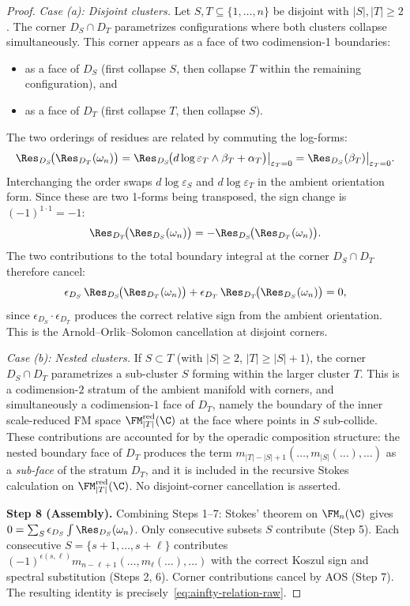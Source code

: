 \begin{proof}
\emph{Case (a): Disjoint clusters.} Let $S, T \subseteq \{1,\ldots,n\}$ be disjoint with $|S|, |T| \geq 2$. The corner $D_S \cap D_T$ parametrizes configurations where both clusters collapse simultaneously. This corner appears as a face of two codimension-1 boundaries:
\begin{itemize}
\item as a face of $D_S$ (first collapse $S$, then collapse $T$ within the remaining configuration), and
\item as a face of $D_T$ (first collapse $T$, then collapse $S$).
\end{itemize}
The two orderings of residues are related by commuting the log-forms:
\[
\Res_{D_S}\!\bigl(\Res_{D_T}(\omega_n)\bigr)
= \Res_{D_S}\!\bigl(d\log\varepsilon_T \wedge \beta_T + \alpha_T\bigr)\big|_{\varepsilon_T=0}
= \Res_{D_S}(\beta_T)\big|_{\varepsilon_T=0}.
\]
Interchanging the order swaps $d\log\varepsilon_S$ and $d\log\varepsilon_T$ in the ambient orientation form. Since these are two 1-forms being transposed, the sign change is $(-1)^{1 \cdot 1} = -1$:
\[
\Res_{D_T}\!\bigl(\Res_{D_S}(\omega_n)\bigr) = -\Res_{D_S}\!\bigl(\Res_{D_T}(\omega_n)\bigr).
\]
The two contributions to the total boundary integral at the corner $D_S \cap D_T$ therefore cancel:
\[
\epsilon_{D_S}\,\Res_{D_S}\!\bigl(\Res_{D_T}(\omega_n)\bigr) + \epsilon_{D_T}\,\Res_{D_T}\!\bigl(\Res_{D_S}(\omega_n)\bigr) = 0,
\]
since $\epsilon_{D_S} \cdot \epsilon_{D_T}$ produces the correct relative sign from the ambient orientation. This is the Arnold--Orlik--Solomon cancellation at disjoint corners.

\emph{Case (b): Nested clusters.} If \(S\subset T\) (with
\(|S|\ge2\), \(|T|\ge |S|+1\)), the corner \(D_S\cap D_T\)
parametrizes a sub-cluster \(S\) forming within the larger cluster
\(T\). This is a codimension-\(2\) stratum of the ambient manifold with
corners, and simultaneously a codimension-\(1\) face of \(D_T\),
namely the boundary of the inner scale-reduced FM space
\(\FM_{|T|}^{\mathrm{red}}(\C)\) at the face where points in \(S\)
sub-collide. These contributions are accounted for by the operadic
composition structure: the nested boundary face of \(D_T\) produces the
term \(m_{|T|-|S|+1}(\ldots,m_{|S|}(\ldots),\ldots)\) as a
\emph{sub-face} of the stratum \(D_T\), and it is included in the
recursive Stokes calculation on \(\FM_{|T|}^{\mathrm{red}}(\C)\). No
disjoint-corner cancellation is asserted.

\medskip
\textbf{Step 8 (Assembly).}
Combining Steps 1--7: Stokes' theorem on $\FM_n(\C)$ gives $0 = \sum_S \epsilon_{D_S} \int \Res_{D_S}(\omega_n)$. Only consecutive subsets $S$ contribute (Step 5). Each consecutive $S = \{s{+}1,\ldots,s{+}\ell\}$ contributes $(-1)^{\epsilon(s,\ell)} m_{n-\ell+1}(\ldots, m_\ell(\ldots), \ldots)$ with the correct Koszul sign and spectral substitution (Steps 2, 6). Corner contributions cancel by AOS (Step 7). The resulting identity is precisely~\eqref{eq:ainfty-relation-raw}.
\end{proof}

